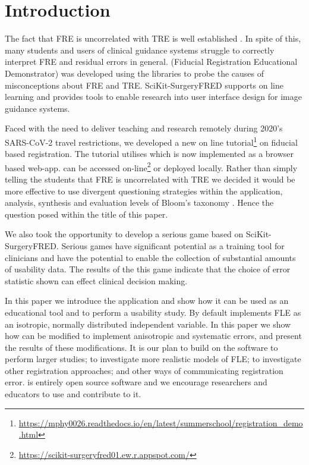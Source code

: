 \section{Introduction}
The fact that \gls{FRE} is uncorrelated with \gls{TRE} is well established 
\cite{fitzpatrick2009}. In spite of this, many students and users of clinical guidance systems struggle to 
correctly interpret \gls{FRE} and residual errors in general. 
\fred (Fiducial Registration Educational Demonstrator)
 \cite{stephen_thompson_2020_4314971} was developed using the 
\sksurgery \cite{PMID:32436132} libraries to probe the causes of misconceptions 
about \gls{FRE} and \gls{TRE}. SciKit-SurgeryFRED supports on line learning and provides tools to enable 
research into user interface design for image guidance systems. 

Faced with the need to deliver teaching and research remotely during 2020's {SARS-CoV-2}\cite{PMID:32123347}
travel restrictions, we 
developed a new on line tutorial\footnote{\url{https://mphy0026.readthedocs.io/en/latest/summerschool/registration_demo.html}}
on fiducial based registration. The tutorial utilises \fred which is now implemented as a browser based web-app. 
\fred can be accessed on-line\footnote{\href{https://scikit-surgeryfred01.ew.r.appspot.com/}{https://scikit-surgeryfred01.ew.r.appspot.com/}} or deployed locally.
Rather than simply telling the students that \gls{FRE} is uncorrelated with \gls{TRE} 
we decided it would be more effective to use divergent questioning strategies\cite{Tofade155} within the application, analysis, synthesis and 
evaluation levels of Bloom's taxonomy \cite{blooms_tax}. Hence the question posed within the title of this paper. 

We also took the opportunity to develop a serious game based on SciKit-SurgeryFRED. Serious games have significant potential 
as a training tool for clinicians \cite{PMID:28133947, serious-needle} and have the potential to enable the collection of substantial amounts of 
usability data. The results of the this game indicate that the choice of error statistic shown can effect clinical decision making.  

In this paper we introduce the \fred application and show how it can
be used as an educational tool and to perform a usability study. By default \fred
implements \gls{FLE} as an isotropic, normally distributed independent variable. 
In this paper we show how \fred can be modified to implement anisotropic and 
systematic errors, and present the results of these modifications. 
It is our plan to build on 
the software to perform larger studies; to investigate more realistic models of \gls{FLE};
to investigate other registration approaches; and other ways of communicating registration error. 
\fred is entirely open 
source software and we encourage researchers and educators to use and contribute to it. 

